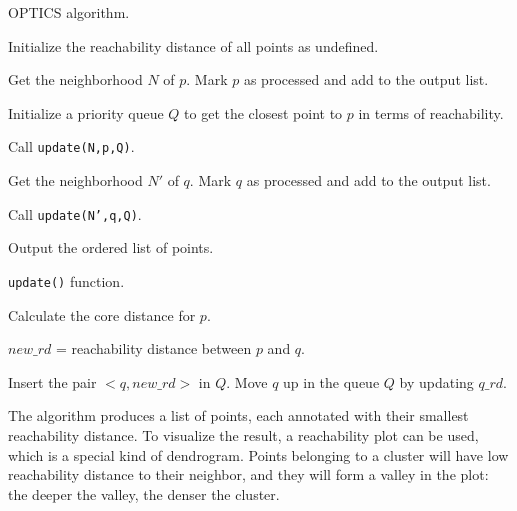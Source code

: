 \begin{algorithm}
\caption{OPTICS algorithm.}
\begin{algorithmic}[1]
    \State Initialize the reachability distance of all points as undefined.

        \State Get the neighborhood $N$ of $p$.
        \State Mark $p$ as processed and add to the output list.

            \State Initialize a priority queue $Q$ to get the closest point to $p$ in terms of reachability.

            \State Call \texttt{update(N,p,Q)}.

                \State Get the neighborhood $N'$ of $q$.
                \State Mark $q$ as processed and add to the output list.

                    \State Call \texttt{update(N',q,Q)}.
                \EndIf
            \EndFor
        \EndIf
    \EndFor

    \State Output the ordered list of points.
\end{algorithmic}
\end{algorithm}

\begin{algorithm}
\caption{\texttt{update()} function.}
\begin{algorithmic}[1]
    \State Calculate the core distance for $p$.

            $new\_rd$ = reachability distance between $p$ and $q$.
        \EndIf

            \State Insert the pair $<q,new\_rd>$ in $Q$.
        \Else
                \State Move $q$ up in the queue $Q$ by updating $q\_rd$.
            \EndIf
        \EndIf
    \EndFor
\end{algorithmic}
\end{algorithm}

The algorithm produces a list of points, each annotated with their smallest reachability distance. To visualize the result, a reachability plot can be used, which is a special kind of dendrogram. Points belonging to a cluster will have low reachability distance to their neighbor, and they will form a valley in the plot: the deeper the valley, the denser the cluster.

